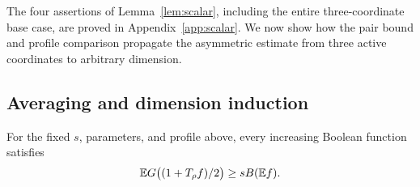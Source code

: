 The four assertions of Lemma~\ref{lem:scalar}, including the entire
three-coordinate base case, are proved in Appendix~\ref{app:scalar}.
We now show how the pair bound and profile comparison propagate the
asymmetric estimate from three active coordinates to arbitrary dimension.

\subsection{Averaging and dimension induction}

\begin{proposition}\label{ind:prop:asymmetric}
For the fixed $s$, parameters, and profile above, every increasing
Boolean function satisfies
\begin{equation}\label{ind:eq:all-dimensions}
 \mathbb E G\bigl((1+T_\rho f)/2\bigr)\ge sB(\mathbb E f).
\end{equation}
\end{proposition}

